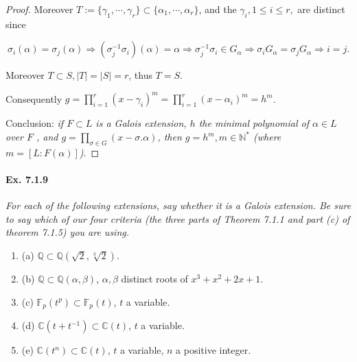 \documentclass[11pt,a4paper]{article}
\newcommand{\be} {\begin{enumerate}}
\newcommand{\ee} {\end{enumerate}}
\newcommand{\Q}{\mathbb{Q}}
\newcommand{\N}{\mathbb{N}}
\newcommand{\C}{\mathbb{C}}
\newcommand{\F}{\mathbb{F}}
\begin{document}
\begin{proof}
Moreover $T:=\{\gamma_1,\cdots,\gamma_r\} \subset \{\alpha_1,\cdots,\alpha_r\}$, and the $\gamma_i, 1\leq i \leq r,$ are distinct since

$$\sigma_i(\alpha) = \sigma_j(\alpha) \Rightarrow (\sigma_j^{-1} \sigma_i)(\alpha) = \alpha \Rightarrow \sigma_j^{-1} \sigma_i \in G_\alpha  \Rightarrow \sigma_i G_\alpha = \sigma_j G_\alpha \Rightarrow i=j.$$

Moreover $T \subset S, \vert T \vert = \vert S \vert = r$, thus $T = S$.

Consequently
$g = \prod\limits_{i=1}^r (x-\gamma_i)^m = \prod\limits_{i=1}^r (x-\alpha_i)^m = h^m$.

Conclusion: {\it  if $F\subset L$ is a Galois extension, $h$ the minimal polynomial of $\alpha \in L$ over $F$ , and $g = \prod\limits_{\sigma \in G} (x - \sigma.\alpha)$, then $g=h^m, m\in \N^*$ (where $m = [L : F(\alpha)]$)}.
\end{proof}

\paragraph{Ex. 7.1.9}

{\it For each of the following extensions, say whether it is a Galois extension. Be sure to say which of our four criteria (the three parts of Theorem 7.1.1 and part (c) of theorem 7.1.5) you are using.
\be
\item[(a)] $\Q \subset \Q(\sqrt{2},\sqrt[3]{2})$.
\item[(b)] $\Q \subset \Q(\alpha,\beta)$, $\alpha, \beta$ distinct roots of $x^3+x^2+2x+1$.
\item[(c)] $\F_p(t^p) \subset \F_p(t)$, $t$ a variable.
\item[(d)] $\C(t+t^{-1}) \subset \C(t)$, $t$ a variable.
\item[(e)] $\C(t^n) \subset \C(t)$, $t$ a variable, $n$ a positive integer.
\ee
}
\end{document}
